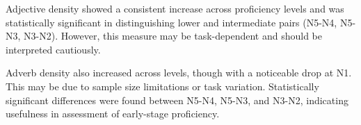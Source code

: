 Adjective density showed a consistent increase across proficiency levels and was statistically significant in
distinguishing lower and intermediate pairs (N5-N4, N5-N3, N3-N2). However, this measure may be task-dependent and
should
be interpreted cautiously.

Adverb density also increased across levels, though with a noticeable drop at N1. This may be due to sample size
limitations or task variation. Statistically significant differences were found between N5-N4, N5-N3, and N3-N2,
indicating usefulness in assessment of early-stage proficiency.

